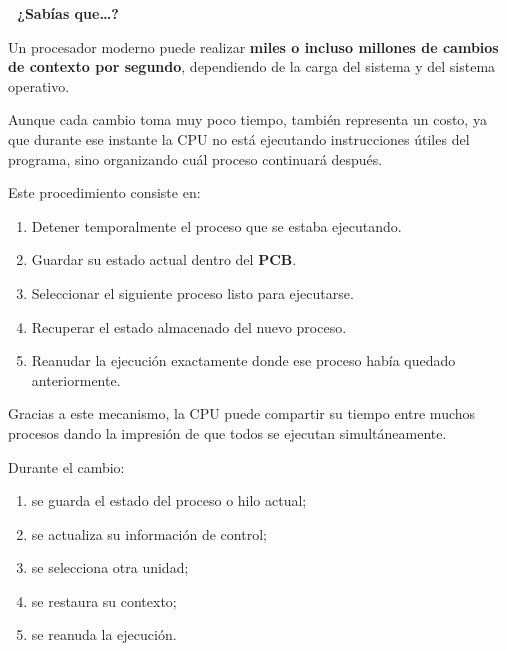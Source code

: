 \documentclass[
  spanish,
  letterpaper,
]{scrbook}
\providecommand{\tightlist}{%
  \setlength{\itemsep}{0pt}\setlength{\parskip}{0pt}}
\begin{document}
\begin{tcolorbox}[enhanced jigsaw, arc=.35mm, bottomrule=.15mm, breakable, colback=white, colframe=quarto-callout-note-color-frame, left=2mm, leftrule=.75mm, opacityback=0, rightrule=.15mm, toprule=.15mm]

\vspace{-3mm}\textbf{🧠 ¿Sabías que\ldots?}\vspace{3mm}

Un procesador moderno puede realizar \textbf{miles o incluso millones de
cambios de contexto por segundo}, dependiendo de la carga del sistema y
del sistema operativo.

Aunque cada cambio toma muy poco tiempo, también representa un costo, ya
que durante ese instante la CPU no está ejecutando instrucciones útiles
del programa, sino organizando cuál proceso continuará después.

\end{tcolorbox}

Este procedimiento consiste en:

\begin{enumerate}
\def\labelenumi{\arabic{enumi}.}
\tightlist
\item
  Detener temporalmente el proceso que se estaba ejecutando.
\item
  Guardar su estado actual dentro del \textbf{PCB}.
\item
  Seleccionar el siguiente proceso listo para ejecutarse.
\item
  Recuperar el estado almacenado del nuevo proceso.
\item
  Reanudar la ejecución exactamente donde ese proceso había quedado
  anteriormente.
\end{enumerate}

Gracias a este mecanismo, la CPU puede compartir su tiempo entre muchos
procesos dando la impresión de que todos se ejecutan simultáneamente.

Durante el cambio:

\begin{enumerate}
\def\labelenumi{\arabic{enumi}.}
\tightlist
\item
  se guarda el estado del proceso o hilo actual;
\item
  se actualiza su información de control;
\item
  se selecciona otra unidad;
\item
  se restaura su contexto;
\item
  se reanuda la ejecución.
\end{enumerate}
\end{document}

